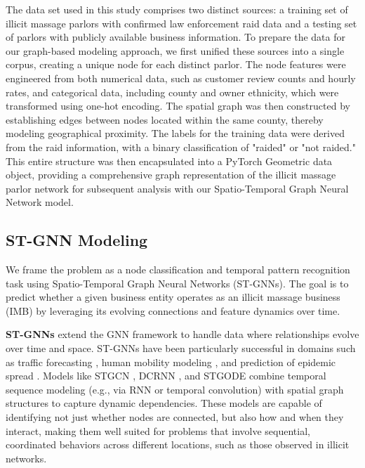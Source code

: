 \documentclass[letterpaper]{article} %
\begin{document}
The data set used in this study comprises two distinct sources: a training set of illicit massage parlors with confirmed law enforcement raid data and a testing set of parlors with publicly available business information. To prepare the data for our graph-based modeling approach, we first unified these sources into a single corpus, creating a unique node for each distinct parlor. The node features were engineered from both numerical data, such as customer review counts and hourly rates, and categorical data, including county and owner ethnicity, which were transformed using one-hot encoding. The spatial graph was then constructed by establishing edges between nodes located within the same county, thereby modeling geographical proximity. The labels for the training data were derived from the raid information, with a binary classification of "raided" or "not raided." This entire structure was then encapsulated into a PyTorch Geometric data object, providing a comprehensive graph representation of the illicit massage parlor network for subsequent analysis with our Spatio-Temporal Graph Neural Network model.

\subsection{ST-GNN Modeling}

We frame the problem as a node classification and temporal pattern recognition task using Spatio-Temporal Graph Neural Networks (ST-GNNs). The goal is to predict whether a given business entity operates as an illicit massage business (IMB) by leveraging its evolving connections and feature dynamics over time.

\textbf{ST-GNNs} extend the GNN framework to handle data where relationships evolve over time and space. ST-GNNs have been particularly successful in domains such as traffic forecasting \cite{10.1007/978-3-031-78255-8_9}, human mobility modeling \cite{yu2018spatio}, and prediction of epidemic spread \cite{li2018diffusion}. Models like STGCN \cite{yu2018spatio}, DCRNN \cite{li2018diffusion}, and STGODE \cite{zhao2023learning} combine temporal sequence modeling (e.g., via RNN or temporal convolution) with spatial graph structures to capture dynamic dependencies. These models are capable of identifying not just whether nodes are connected, but also how and when they interact, making them well suited for problems that involve sequential, coordinated behaviors across different locations, such as those observed in illicit networks.
\end{document}
